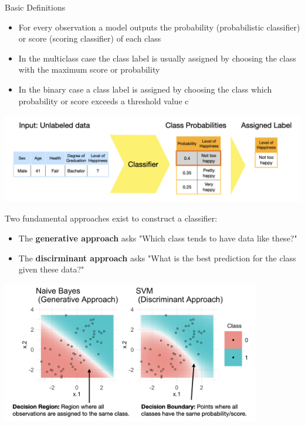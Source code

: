 \documentclass[11pt,compress,t,notes=noshow, xcolor=table]{beamer}
\begin{document}
\begin{vbframe}{Basic Definitions}
\begin{itemize}
\item \small For every observation a model outputs the probability (probabilistic classifier) or score (scoring classifier) of each class
\item \small In the multiclass case the class label is usually assigned by choosing the class with the maximum score or probability
\item \small In the binary case a class label is assigned by choosing the class which probability or score exceeds a threshold value c
\end{itemize}

\vspace{5mm}

\begin{center}
  \includegraphics[width = \textwidth]{slides/supervised-classification/figure_man/nutshell-classification-label-assignment.png}
\end{center}

Two fundamental approaches exist to construct a classifier:
\begin{itemize}
\item \small The \textbf{generative approach} asks "Which class tends to have data like these?" 
\item \small The \textbf{discirminant approach} asks "What is the best prediction for the class given these data?"
\end{itemize}

\begin{center}
  \includegraphics[width = 0.85\textwidth]{slides/supervised-classification/figure_man/nutshell_classif_binary_task.png}
\end{center}
\end{vbframe}
\end{document}
